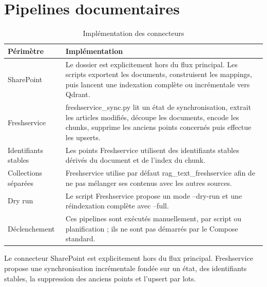 \section{Pipelines documentaires}
\begin{table}[H]
\centering
\caption{Implémentation des connecteurs}
\label{tab:connectors_impl_ch6}
\begin{tabular}{p{3.5cm}p{9.7cm}}
\toprule
\textbf{Périmètre} & \textbf{Implémentation} \\
\midrule
SharePoint & Le dossier est explicitement hors du flux principal. Les scripts exportent les documents, construisent les mappings, puis lancent une indexation complète ou incrémentale vers Qdrant. \\
Freshservice & freshservice\_sync.py lit un état de synchronisation, extrait les articles modifiés, découpe les documents, encode les chunks, supprime les anciens points concernés puis effectue les upserts. \\
Identifiants stables & Les points Freshservice utilisent des identifiants stables dérivés du document et de l’index du chunk. \\
Collections séparées & Freshservice utilise par défaut rag\_text\_freshservice afin de ne pas mélanger ses contenus avec les autres sources. \\
Dry run & Le script Freshservice propose un mode --dry-run et une réindexation complète avec --full. \\
Déclenchement & Ces pipelines sont exécutés manuellement, par script ou planification ; ils ne sont pas démarrés par le Compose standard. \\
\bottomrule
\end{tabular}
\end{table}

Le connecteur SharePoint est explicitement hors du flux principal. Freshservice propose une synchronisation incrémentale fondée sur un état, des identifiants stables, la suppression des anciens points et l'upsert par lots.

